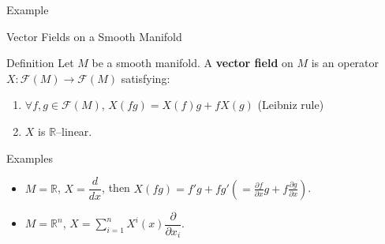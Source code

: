 \begin{frame}{Example}
\begin{center}
\end{center}
\end{frame}


\begin{frame}{Vector Fields on a Smooth Manifold}
\begin{block}{Definition}
Let $M$ be a smooth manifold.
A \textbf{vector field} on $M$ is an operator $X:\mathcal{F}(M)\to\mathcal{F}(M)$ satisfying:
\begin{enumerate}
\item $\forall f,g\in\mathcal{F}(M)$, $X(fg)=X(f)g+fX(g)$ \hfill (Leibniz rule)
\item $X$ is $\mathbb{R}$–linear.
\end{enumerate}
\end{block}

\begin{exampleblock}{Examples}
\begin{itemize}
\item $M=\mathbb{R}$, $X=\dfrac{d}{dx}$, then $X(fg)=f'g+fg' (=\frac{\partial f}{\partial x}g + f\frac{\partial g}{\partial x})$.
\item $M=\mathbb{R}^n$, $X=\displaystyle\sum_{i=1}^{n} X^i(x)\dfrac{\partial}{\partial x_i}$.
\end{itemize}
\end{exampleblock}
\end{frame}


